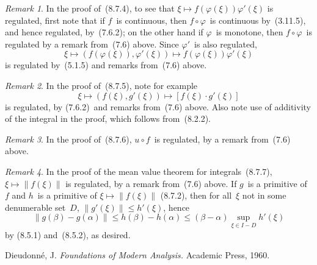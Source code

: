 \documentclass[letterpaper,12pt]{article}
\newcommand{\after}{\circ}
\newcommand{\norm}[1]{\lVert{#1}\rVert}
\newcommand{\cbprod}[2]{[{#1}\cdot{#2}]}
\theoremstyle{plain}
\theoremstyle{definition}
\theoremstyle{remark}
\newtheorem*{rmk}{Remark}
\begin{document}
\begin{rmk}
In the proof of~(8.7.4), to see that \(\xi\mapsto f(\varphi(\xi))\varphi'(\xi)\) is regulated, first note that if \(f\)~is continuous, then \(f\after\varphi\)~is continuous by~(3.11.5), and hence regulated, by~(7.6.2); on the other hand if \(\varphi\)~is monotone, then \(f\after\varphi\)~is regulated by a remark from~(7.6) above. Since \(\varphi'\)~is also regulated,
\[\xi\mapsto(f(\varphi(\xi)),\varphi'(\xi))\mapsto f(\varphi(\xi))\varphi'(\xi)\]
is regulated by~(5.1.5) and remarks from~(7.6) above.
\end{rmk}

\begin{rmk}
In the proof of~(8.7.5), note for example
\[\xi\mapsto(f(\xi),g'(\xi))\mapsto\cbprod{f(\xi)}{g'(\xi)}\]
is regulated, by (7.6.2)~and remarks from~(7.6) above. Also note use of additivity of the integral in the proof, which follows from~(8.2.2).
\end{rmk}

\begin{rmk}
In the proof of~(8.7.6), \(u\after f\)~is regulated, by a remark from~(7.6) above.
\end{rmk}

\begin{rmk}
In the proof of the mean value theorem for integrals~(8.7.7), \(\xi\mapsto\norm{f(\xi)}\) is regulated, by a remark from~(7.6) above. If \(g\)~is a primitive of~\(f\) and \(h\)~is a primitive of \(\xi\mapsto\norm{f(\xi)}\) (8.7.2), then for all~\(\xi\) not in some denumerable set~\(D\), \(\norm{g'(\xi)}\le h'(\xi)\), hence
\[\norm{g(\beta)-g(\alpha)}\le h(\beta)-h(\alpha)\le(\beta-\alpha)\sup_{\xi\in I-D} h'(\xi)\]
by (8.5.1) and~(8.5.2), as desired.
\end{rmk}

\begin{thebibliography}{0}
 Dieudonn\'e, J. \textit{Foundations of Modern Analysis.} Academic Press, 1960.
\end{thebibliography}
\end{document}
